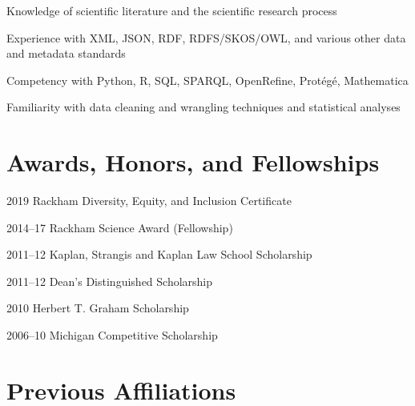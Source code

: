 \documentclass[12pt,letterpaper]{report}
\newcommand{\listitemspace}{0.25em}
\renewenvironment{itemize}
{\begin{list}{}{\setlength{\leftmargin}{0em}
            \setlength{\parskip}{0em}
            \setlength{\itemsep}{\listitemspace}
            \setlength{\parsep}{\listitemspace}}}
{\end{list}}
\begin{document}
\begin{itemize}

	\item Knowledge of scientific literature and the scientific research process
        
	\item Experience with XML, JSON, RDF, RDFS/SKOS/OWL, and various other data and metadata standards
        
	\item Competency with Python, R, SQL, SPARQL, OpenRefine, Protégé, Mathematica
        
	\item Familiarity with data cleaning and wrangling techniques and statistical analyses
        
\end{itemize}



\section*{Awards, Honors, and Fellowships}

\begin{tablist}
    
	\item[2019] \tab Rackham Diversity, Equity, and Inclusion Certificate

	\item[2014--17] \tab Rackham Science Award (Fellowship)
        
	\item[2011--12] \tab Kaplan, Strangis and Kaplan Law School Scholarship 
        
	\item[2011--12] \tab Dean's Distinguished Scholarship
        
	\item[2010] \tab Herbert T. Graham Scholarship
        
	\item[2006--10] \tab Michigan Competitive Scholarship

\end{tablist}

    
    
\section*{Previous Affiliations}
    
\end{document}
